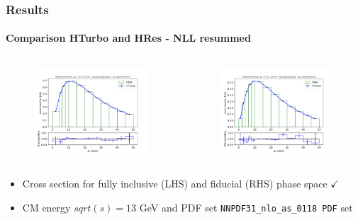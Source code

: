 \documentclass[aspectratio=43]{beamer}
\begin{document}
\begin{frame}
	
	\frametitle{Results}
	\framesubtitle{Comparison HTurbo and HRes - NLL resummed}
	
	\begin{columns}
		
		
		\begin{figure}
			\includegraphics[width = 7cm]{plots/part3/chapter6/nlo-res-1.png}
		\end{figure}
		
		
		\begin{figure}
			\includegraphics[width = 7cm]{plots/part3/chapter6/nlo-res-fid-1.png}
		\end{figure}
		
	\end{columns}
	
	\begin{itemize}
		\item Cross section for fully inclusive (LHS) and fiducial (RHS) phase space {\color{darkgreen}$\checkmark$} 
		\item CM energy $sqrt(s) = 13$ GeV and PDF set \texttt{NNPDF31\_nlo\_as\_0118 PDF} set
	\end{itemize}

\end{frame}
\end{document}
